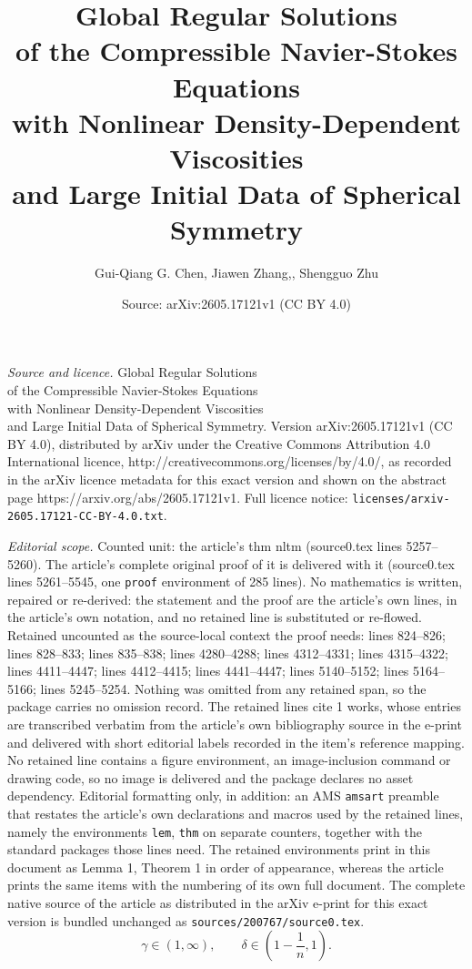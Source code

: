 \documentclass[10pt,a4paper]{amsart}
\title{Global Regular Solutions \\[0.5mm] of the Compressible Navier-Stokes Equations \\[0.5mm] with Nonlinear Density-Dependent Viscosities\\[0.5mm] and Large Initial Data of Spherical Symmetry}
\author{Gui-Qiang G. Chen, Jiawen Zhang,, Shengguo Zhu}
\date{Source: arXiv:2605.17121v1 (CC BY 4.0)}
\begin{document}
\maketitle

\noindent\emph{Source and licence.} Global Regular Solutions \\[0.5mm] of the Compressible Navier-Stokes Equations \\[0.5mm] with Nonlinear Density-Dependent Viscosities\\[0.5mm] and Large Initial Data of Spherical Symmetry. Version arXiv:2605.17121v1 (CC BY 4.0), distributed by arXiv under the Creative Commons Attribution 4.0 International licence, http://creativecommons.org/licenses/by/4.0/, as recorded in the arXiv licence metadata for this exact version and shown on the abstract page https://arxiv.org/abs/2605.17121v1. Full licence notice: \texttt{licenses/arxiv-2605.17121-CC-BY-4.0.txt}.\par\smallskip

\noindent\textit{Editorial scope.} Counted unit: the article's thm nltm (source0.tex lines 5257--5260). The article's complete original proof of it is delivered with it (source0.tex lines 5261--5545, one \texttt{proof} environment of 285 lines). No mathematics is written, repaired or re-derived: the statement and the proof are the article's own lines, in the article's own notation, and no retained line is substituted or re-flowed.  Retained uncounted as the source-local context the proof needs: lines 824--826; lines 828--833; lines 835--838; lines 4280--4288; lines 4312--4331; lines 4315--4322; lines 4411--4447; lines 4412--4415; lines 4441--4447; lines 5140--5152; lines 5164--5166; lines 5245--5254.  Nothing was omitted from any retained span, so the package carries no omission record.  The retained lines cite 1 works, whose entries are transcribed verbatim from the article's own bibliography source in the e-print and delivered with short editorial labels recorded in the item's reference mapping.  No retained line contains a figure environment, an image-inclusion command or drawing code, so no image is delivered and the package declares no asset dependency.  Editorial formatting only, in addition: an AMS \texttt{amsart} preamble that restates the article's own declarations and macros used by the retained lines, namely the environments \texttt{lem}, \texttt{thm} on separate counters, together with the standard packages those lines need.  The retained environments print in this document as Lemma 1, Theorem 1 in order of appearance, whereas the article prints the same items with the numbering of its own full document.  The complete native source of the article as distributed in the arXiv e-print for this exact version is bundled unchanged as \texttt{sources/200767/source0.tex}.
\begin{equation}\label{canshu}
\gamma\in (1,\infty),\qquad\delta\in (1-\frac{1}{n},1).    
\end{equation}
\end{document}
